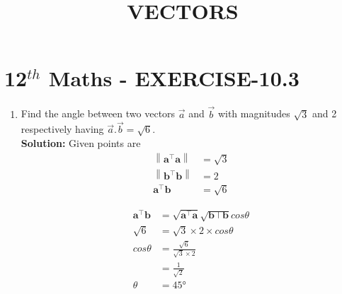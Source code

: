 \documentclass[10pt]{article}
\newcommand{\solution}{\noindent \textbf{Solution: }}
\providecommand{\norm}[1]{\left\lVert#1\right\rVert}
\let\vec\mathbf{}
\begin{document}
\begin{center}
\title{\textbf{VECTORS}}
\date{\vspace{-5ex}} %
\maketitle
\end{center}

\section{12$^{th}$ Maths - EXERCISE-10.3}

\begin{enumerate}
\item Find the angle between two vectors $\overrightarrow{a}$ and $\overrightarrow {b} $ with magnitudes $\sqrt{3}$ and 2 respectively having $\overrightarrow {a}.\overrightarrow {b}=\sqrt{6}$.\\  

\solution
Given points are
\begin{align}
\norm{\vec{a}^\top\vec{a}}&=\sqrt{3}\\
\norm{\vec{b}^\top\vec{b}}&= 2\\
{\vec{a}^{\top}}{\vec{b}}&=\sqrt{6}  
\end{align}

\begin{align}
 {\vec{a}^\top}{\vec{b}} &=\sqrt{\vec{a}^\top {\vec{a}}}\sqrt{\vec{b}\top {\vec{b}}} cos\theta\\
\sqrt{6}&=\sqrt{3}\times 2 \times cos\theta\\
cos\theta&=\frac{\sqrt{6}}{\sqrt{3}\times2}\\
&=\frac{1}{\sqrt{2}}\\
\theta&=\ang{45}
\end{align}
\end{enumerate}
\end{document}
